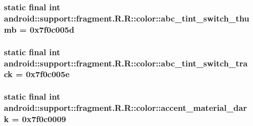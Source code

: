 \hypertarget{classandroid_1_1support_1_1fragment_1_1_r_1_1color_a06a52b272dba2eb3309f15a1c4a72cc}{
\subsubsection[{abc\_\-tint\_\-switch\_\-thumb}]{\setlength{\rightskip}{0pt plus 5cm}static final int android::support::fragment.R.R::color::abc\_\-tint\_\-switch\_\-thumb = 0x7f0c005d}}
\label{classandroid_1_1support_1_1fragment_1_1_r_1_1color_a06a52b272dba2eb3309f15a1c4a72cc}


\hypertarget{classandroid_1_1support_1_1fragment_1_1_r_1_1color_280887cdd7a28c3ac0396109e3213e46}{
\subsubsection[{abc\_\-tint\_\-switch\_\-track}]{\setlength{\rightskip}{0pt plus 5cm}static final int android::support::fragment.R.R::color::abc\_\-tint\_\-switch\_\-track = 0x7f0c005e}}
\label{classandroid_1_1support_1_1fragment_1_1_r_1_1color_280887cdd7a28c3ac0396109e3213e46}


\hypertarget{classandroid_1_1support_1_1fragment_1_1_r_1_1color_ac7c6fabde842e69c410562f6607471f}{
\subsubsection[{accent\_\-material\_\-dark}]{\setlength{\rightskip}{0pt plus 5cm}static final int android::support::fragment.R.R::color::accent\_\-material\_\-dark = 0x7f0c0009}}
\label{classandroid_1_1support_1_1fragment_1_1_r_1_1color_ac7c6fabde842e69c410562f6607471f}


